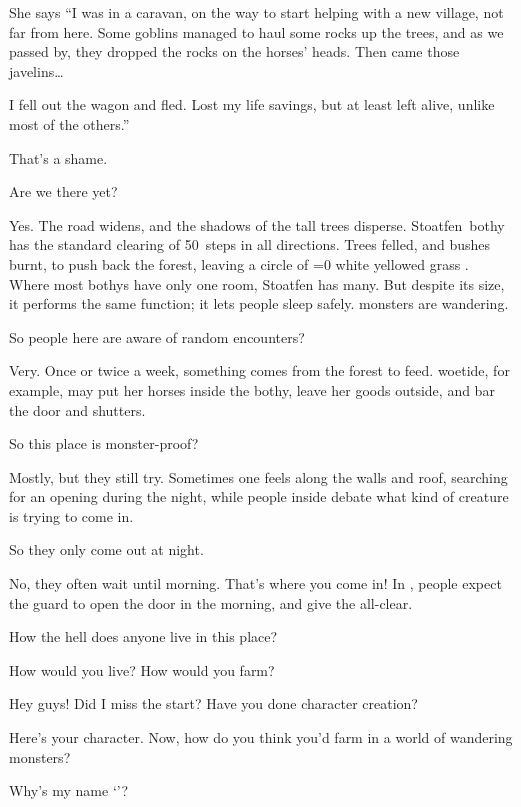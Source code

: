 \begin{multicols}{3}
\begin{description}
  She says
  ``I was in a caravan, on the way to start helping with a new \gls{village}, not far from here.
  Some goblins managed to haul some rocks up the trees, and as we passed by, they dropped the rocks on the horses' heads.
  Then came those javelins\ldots

  I fell out the wagon and fled.
  Lost my life savings, but at least left alive, unlike most of the others.''

  \item[Player 1:]
  That's a shame.
  \item[Player 2:]
  Are we there yet?
  \item[\Glsentrytext{gm}:]
  Yes.
  The road widens, and the shadows of the tall trees disperse.
  Stoatfen~\Gls{bothy} has the standard clearing of 50~\glspl{step} in all directions.
  Trees felled, and bushes burnt, to push back the forest, leaving a circle of
  \ifnum\value{temperature}=0%
    white%
  \else%
    yellowed grass%
  \fi.%
  Where most \glspl{bothy} have only one room, Stoatfen has many.
  But despite its size, it performs the same function; it lets people sleep safely.
  \Glspl{monster} are wandering.
  \item[Player 1:]
  So people here are aware of random encounters?
  \item[\Glsentrytext{gm}:]
  Very.
  Once or twice a week, something comes from the forest to feed.
  \Gls{woetide}, for example, may put her horses inside the \gls{bothy}, leave her goods outside, and bar the door and shutters.
  \item[Player 2:]
  So this place is \gls{monster}-proof?
  \item[\Glsentrytext{gm}:]
  Mostly, but they still try.
  Sometimes one feels along the walls and roof, searching for an opening during the night, while people inside debate what kind of creature is trying to come in.
  \item[Player 1:]
  So they only come out at night.
  \item[\Glsentrytext{gm}:]
  No, they often wait until morning.
  That's where you come in!
  In , people expect the \gls{guard} to open the door in the morning, and give the all-clear.
  \item[Player 2:]
  How the hell does anyone live in this place?
  \item[\Glsentrytext{gm}:]
  How would you live?
  How would you farm?
  \item[Player 3:]
  Hey guys!
  Did I miss the start?
  Have you done character creation?
  \item[\Glsentrytext{gm}:]
  Here's your character.
  Now, how do you think you'd farm in a world of wandering monsters?
  \item[Player 3:]
  Why's my name `\composeHumanName'?
\end{description}


\end{multicols}
